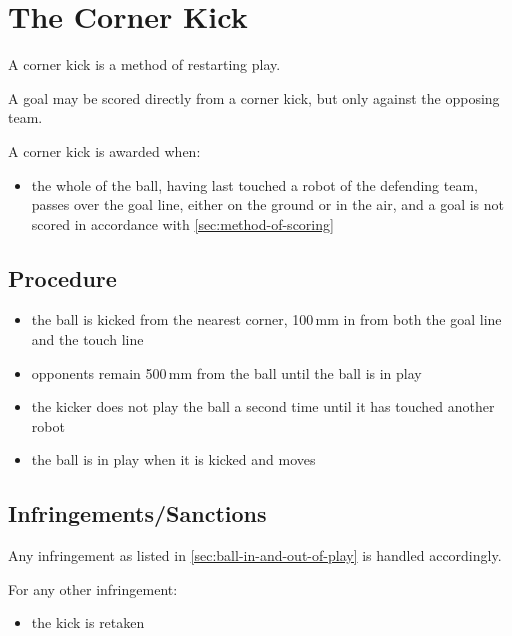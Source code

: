 \section{The Corner Kick}\label{sec:corner-kick}

A corner kick is a method of restarting play.

A goal may be scored directly from a corner kick, but only against the opposing team.

A corner kick is awarded when:

\begin{itemize}
\item the whole of the ball, having last touched a robot of the defending team, passes over the goal line, either on the ground or in the air, and a goal is not scored in accordance with \autoref{sec:method-of-scoring}
\end{itemize}

\subsection{Procedure}
\begin{itemize}
\item the ball is kicked from the nearest corner, 100\,mm in from both the goal line and the touch line
\item opponents remain 500\,mm from the ball until the ball is in play
\item the kicker does not play the ball a second time until it has touched another robot
\item the ball is in play when it is kicked and moves
\end{itemize}

\subsection{Infringements/Sanctions}
Any infringement as listed in \autoref{sec:ball-in-and-out-of-play} is handled accordingly.

For any other infringement:

\begin{itemize}
\item the kick is retaken
\end{itemize}